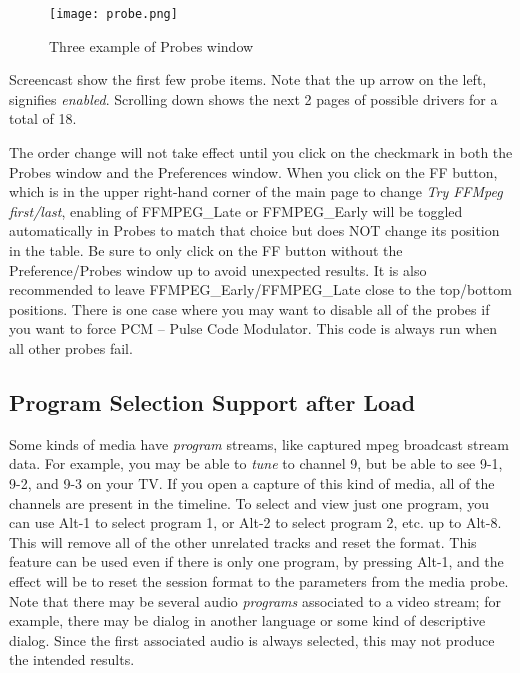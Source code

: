 \begin{figure}[htpb]
    \centering
    \texttt{[image: probe.png]}
    \caption{Three example of Probes window}
    \label{fig:probe}
\end{figure}

Screencast show the first few probe items.  Note that the up arrow on the left, signifies \textit{enabled}.
Scrolling down shows the next 2 pages of possible drivers for a total of 18.

The order change will not take effect until you click on the checkmark in both the Probes window and the Preferences window.  When you click on the FF button, which is in the upper right-hand corner of the main page to change \textit{Try FFMpeg first/last}, enabling of FFMPEG\_Late or FFMPEG\_Early will be toggled automatically in Probes to match that choice but does NOT change its position in the table. Be sure to only click on the FF button without the Preference/Probes window up to avoid unexpected results.  It is also recommended to leave FFMPEG\_Early/FFMPEG\_Late close to the top/bottom positions.  There is one case where you may want to disable all of the probes if you want to force PCM -- Pulse Code Modulator.  This code is always run when all other probes fail.

\subsection{Program Selection Support after Load}%
\label{sub:program_selection_support_load}

Some kinds of media have \textit{program} streams, like captured mpeg broadcast stream data.  For example, you may be able to \textit{tune} to channel 9, but be able to see 9-1, 9-2, and 9-3 on your TV.  If you open a capture of this kind of media, all of the channels are present in the timeline.  To select and view just one program, you can use Alt-1 to select program 1, or Alt-2 to select program 2, etc. up to Alt-8.  This will remove all of the other unrelated tracks and reset the format.  This feature can be used even if there is only one program, by pressing Alt-1, and the effect will be to reset the session format to the parameters from the media probe.  Note that there may be several audio \textit{programs} associated to a video stream;
for example, there may be dialog in another language or some kind of descriptive dialog.  Since the first associated audio is always selected, this may not produce the intended results.

